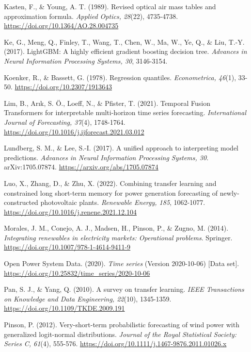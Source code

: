 \documentclass[11pt,a4paper,oneside]{report}
\begin{document}
Kasten, F., \& Young, A. T. (1989). Revised optical air mass tables and approximation formula. \emph{Applied Optics, 28}(22), 4735-4738. \href{https://doi.org/10.1364/AO.28.004735}{https://doi.org/10.1364/AO.28.004735}

Ke, G., Meng, Q., Finley, T., Wang, T., Chen, W., Ma, W., Ye, Q., \& Liu, T.-Y. (2017). LightGBM: A highly efficient gradient boosting decision tree. \emph{Advances in Neural Information Processing Systems, 30}, 3146-3154.

Koenker, R., \& Bassett, G. (1978). Regression quantiles. \emph{Econometrica, 46}(1), 33-50. \href{https://doi.org/10.2307/1913643}{https://doi.org/10.2307/1913643}

Lim, B., Ar\i k, S. \"O., Loeff, N., \& Pfister, T. (2021). Temporal Fusion Transformers for interpretable multi-horizon time series forecasting. \emph{International Journal of Forecasting, 37}(4), 1748-1764. \href{https://doi.org/10.1016/j.ijforecast.2021.03.012}{https://doi.org/10.1016/j.ijforecast.2021.03.012}

Lundberg, S. M., \& Lee, S.-I. (2017). A unified approach to interpreting model predictions. \emph{Advances in Neural Information Processing Systems, 30}. arXiv:1705.07874. \href{https://arxiv.org/abs/1705.07874}{https://arxiv.org/abs/1705.07874}

Luo, X., Zhang, D., \& Zhu, X. (2022). Combining transfer learning and constrained long short-term memory for power generation forecasting of newly-constructed photovoltaic plants. \emph{Renewable Energy, 185}, 1062-1077. \href{https://doi.org/10.1016/j.renene.2021.12.104}{https://doi.org/10.1016/j.renene.2021.12.104}

Morales, J. M., Conejo, A. J., Madsen, H., Pinson, P., \& Zugno, M. (2014). \emph{Integrating renewables in electricity markets: Operational problems}. Springer. \href{https://doi.org/10.1007/978-1-4614-9411-9}{https://doi.org/10.1007/978-1-4614-9411-9}

Open Power System Data. (2020). \emph{Time series} (Version 2020-10-06) [Data set]. \href{https://doi.org/10.25832/time_series/2020-10-06}{https://doi.org/10.25832/time\_series/2020-10-06}

Pan, S. J., \& Yang, Q. (2010). A survey on transfer learning. \emph{IEEE Transactions on Knowledge and Data Engineering, 22}(10), 1345-1359. \href{https://doi.org/10.1109/TKDE.2009.191}{https://doi.org/10.1109/TKDE.2009.191}

Pinson, P. (2012). Very-short-term probabilistic forecasting of wind power with generalized logit-normal distributions. \emph{Journal of the Royal Statistical Society: Series C, 61}(4), 555-576. \href{https://doi.org/10.1111/j.1467-9876.2011.01026.x}{https://doi.org/10.1111/j.1467-9876.2011.01026.x}
\end{document}
